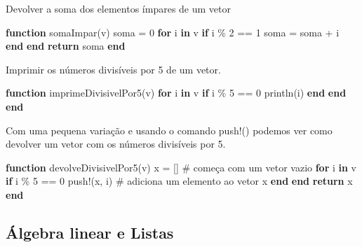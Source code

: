 \documentclass[
  letterpaper,
  DIV=11,
  numbers=noendperiod]{scrreprt}
\newenvironment{Shaded}{\begin{snugshade}}{\end{snugshade}}
\newcommand{\CommentTok}[1]{\textcolor[rgb]{0.37,0.37,0.37}{#1}}
\newcommand{\ControlFlowTok}[1]{\textcolor[rgb]{0.00,0.23,0.31}{\textbf{#1}}}
\newcommand{\FloatTok}[1]{\textcolor[rgb]{0.68,0.00,0.00}{#1}}
\newcommand{\FunctionTok}[1]{\textcolor[rgb]{0.28,0.35,0.67}{#1}}
\newcommand{\KeywordTok}[1]{\textcolor[rgb]{0.00,0.23,0.31}{\textbf{#1}}}
\newcommand{\NormalTok}[1]{\textcolor[rgb]{0.00,0.23,0.31}{#1}}
\newcommand{\OperatorTok}[1]{\textcolor[rgb]{0.37,0.37,0.37}{#1}}
\begin{document}
Devolver a soma dos elementos ímpares de um vetor

\begin{Shaded}
\begin{Highlighting}[]
\KeywordTok{function} \FunctionTok{somaImpar}\NormalTok{(v)}
\NormalTok{    soma }\OperatorTok{=} \FloatTok{0}
    \ControlFlowTok{for}\NormalTok{ i }\KeywordTok{in}\NormalTok{ v}
        \ControlFlowTok{if}\NormalTok{ i }\OperatorTok{\%} \FloatTok{2} \OperatorTok{==} \FloatTok{1}
\NormalTok{            soma }\OperatorTok{=}\NormalTok{ soma }\OperatorTok{+}\NormalTok{ i}
        \ControlFlowTok{end}
    \ControlFlowTok{end}
    \ControlFlowTok{return}\NormalTok{ soma}
\KeywordTok{end}
\end{Highlighting}
\end{Shaded}

Imprimir os números divisíveis por 5 de um vetor.

\begin{Shaded}
\begin{Highlighting}[]
\KeywordTok{function} \FunctionTok{imprimeDivisivelPor5}\NormalTok{(v)}
    \ControlFlowTok{for}\NormalTok{ i }\KeywordTok{in}\NormalTok{ v}
        \ControlFlowTok{if}\NormalTok{ i }\OperatorTok{\%} \FloatTok{5} \OperatorTok{==} \FloatTok{0}
            \FunctionTok{println}\NormalTok{(i)}
        \ControlFlowTok{end}
    \ControlFlowTok{end}
\KeywordTok{end}
\end{Highlighting}
\end{Shaded}

Com uma pequena variação e usando o comando push!() podemos ver como
devolver um vetor com os números divisíveis por 5.

\begin{Shaded}
\begin{Highlighting}[]
\KeywordTok{function} \FunctionTok{devolveDivisivelPor5}\NormalTok{(v)}
\NormalTok{    x }\OperatorTok{=}\NormalTok{ []  }\CommentTok{\# começa com um vetor vazio}
    \ControlFlowTok{for}\NormalTok{ i }\KeywordTok{in}\NormalTok{ v}
        \ControlFlowTok{if}\NormalTok{ i }\OperatorTok{\%} \FloatTok{5} \OperatorTok{==} \FloatTok{0}
            \FunctionTok{push!}\NormalTok{(x, i)  }\CommentTok{\# adiciona um elemento ao vetor x}
        \ControlFlowTok{end}
    \ControlFlowTok{end}
    \ControlFlowTok{return}\NormalTok{ x}
\KeywordTok{end}
\end{Highlighting}
\end{Shaded}

\subsection{Álgebra linear e Listas}\label{uxe1lgebra-linear-e-listas}
\end{document}
